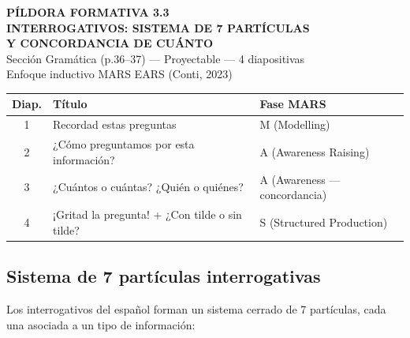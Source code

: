 \documentclass[a4paper,10pt]{article}
\renewcommand{\arraystretch}{1.3}
\begin{document}

\begin{center}
{\LARGE\textbf{\textcolor{naranja}{PÍLDORA FORMATIVA 3.3}}}\\[0.3cm]
{\Large\textbf{INTERROGATIVOS: SISTEMA DE 7 PARTÍCULAS}}\\[0.1cm]
{\Large\textbf{Y CONCORDANCIA DE CUÁNTO}}\\[0.3cm]
{\normalsize Sección Gramática (p.36--37) — Proyectable — 4 diapositivas}\\[0.1cm]
{\small Enfoque inductivo MARS EARS (Conti, 2023)}
\end{center}

\vspace{0.4cm}

\begin{tcolorbox}[
  colback=naranja!8,
  colframe=naranja,
  title={\textbf{Resumen de diapositivas}},
  fonttitle=\bfseries,
  boxrule=0.8pt,
  arc=3pt
]
\renewcommand{\arraystretch}{1.4}
\begin{tabular}{c l l}
\textbf{Diap.} & \textbf{Título} & \textbf{Fase MARS} \\
\midrule
1 & Recordad estas preguntas & M (Modelling) \\
2 & ¿Cómo preguntamos por esta información? & A (Awareness Raising) \\
3 & ¿Cuántos o cuántas? ¿Quién o quiénes? & A (Awareness --- concordancia) \\
4 & ¡Gritad la pregunta! + ¿Con tilde o sin tilde? & S (Structured Production) \\
\end{tabular}
\end{tcolorbox}

\vspace{0.4cm}

\subsection*{\textcolor{naranja}{Sistema de 7 partículas interrogativas}}

Los interrogativos del español forman un sistema cerrado de 7 partículas, cada una asociada a un tipo de información:

\vspace{0.2cm}
\end{document}
